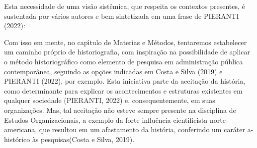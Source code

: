 \documentclass[
12pt,		%
openright,	%
twoside,  %
a4paper,			%
chapter=TITLE,		%
english,			%
french,				%
spanish,			%
brazil				%
]{USPSC-classe/USPSC}
\begin{document}
Esta necessidade de uma vis\~ao sist\^emica, que respeita os contextos presentes, \'e sustentada por v\'arios autores e bem sintetizada em uma frase de PIERANTI (2022):


















\noindent\begin{center}\mbox{\centering{}}\end{center}


Com isso em mente, no cap\'{\i}tulo de Materias e M\'etodos, tentaremos estabelecer um caminho pr\'oprio de historiografia, com inspira\c{c}\~ao na possibilidade de aplicar o m\'etodo historiogr\'afico como elemento de pesquisa em administra\c{c}\~ao p\'ublica contempor\^anea, seguindo as op\c{c}\~oes indicadas em   Costa e Silva (2019) e PIERANTI (2022), por exemplo. Esta iniciativa parte da aceita\c{c}\~ao da hist\'oria, como determinante para explicar os acontecimentos e estruturas existentes em qualquer sociedade (PIERANTI, 2022) e, consequentemente, em suas organiza\c{c}\~oes. Mas, tal aceita\c{c}\~ao n\~ao esteve sempre presente na disciplina de Estudos Organizacionais, a exemplo da \textquotedbl forte influ\^encia cientificista norte-americana, que resultou em um afastamento da hist\'oria, conferindo um car\'ater a-hist\'orico \`as pesquisas\textquotedbl   (Costa e Silva, 2019).
\end{document}
